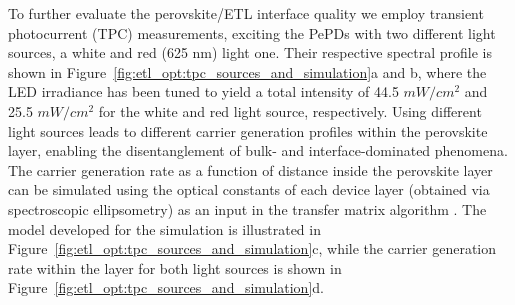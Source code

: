 To further evaluate the perovskite/ETL interface quality we employ transient photocurrent (TPC) measurements, exciting the PePDs with two different light sources, a white and red (625 nm) light one. Their respective spectral profile is shown in Figure~\ref{fig:etl_opt:tpc_sources_and_simulation}a and b, where the LED irradiance has been tuned to yield a total intensity of 44.5 $mW/cm^2$ and 25.5 $mW/cm^2$ for the white and red light source, respectively. Using different light sources leads to different carrier generation profiles within the perovskite layer, enabling the disentanglement of bulk- and interface-dominated phenomena. The carrier generation rate as a function of distance inside the perovskite layer can be simulated using the optical constants of each device layer (obtained via spectroscopic ellipsometry) as an input in the transfer matrix algorithm \cite{Burkhard2010AccountingCells}. The model developed for the simulation is illustrated in Figure~\ref{fig:etl_opt:tpc_sources_and_simulation}c, while  the carrier generation rate within the  layer for both light sources is shown in Figure~\ref{fig:etl_opt:tpc_sources_and_simulation}d. 


